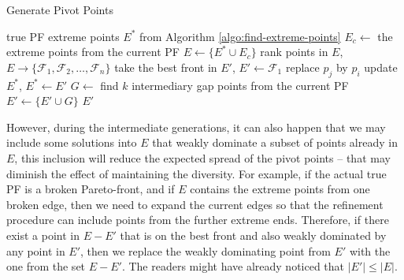 \documentclass[journal]{IEEEtran}
\let\MYoriglatexcaption\caption
\renewcommand{\caption}[2][\relax]{\MYoriglatexcaption[#2]{#2}}
\begin{document}
\begin{algorithm}[tp]
\caption{Generate Pivot Points}
\label{algo:generate-pivot-points}
\begin{algorithmic}[1]
	\REQUIRE true PF extreme points $E^{\ast}$ from Algorithm \ref{algo:find-extreme-points}
	\STATE $E_c \leftarrow$ the extreme points from the current PF
	\STATE $E \leftarrow \{E^\ast \cup E_c\}$
	\STATE rank points in $E$, $E \rightarrow \{\mathcal{F}_1, \mathcal{F}_2, \ldots, \mathcal{F}_n\}$
	\STATE take the best front in $E'$, $E' \leftarrow \mathcal{F}_1$
			\STATE replace $p_j$ by $p_i$
		\ENDIF
	\ENDFOR
	\STATE update $E^\ast$, $E^\ast \leftarrow E'$
	\STATE $G \leftarrow$ find $k$ intermediary gap points from the current PF
	\STATE $E' \leftarrow \{E' \cup G\}$
	\RETURN $E'$
\end{algorithmic}
\end{algorithm}

However, during the intermediate generations, it can also happen that we may include some solutions into \(E\) that weakly dominate a subset of points already in \(E\), this inclusion will reduce the expected spread of the pivot points -- that may diminish the effect of maintaining the diversity. For example, if the actual true PF is a broken Pareto-front, and if \(E\) contains the extreme points from one broken edge, then we need to expand the current edges so that the refinement procedure can include points from the further extreme ends. Therefore, if there exist a point in \(E - E'\) that is on the best front and also weakly dominated by any point in \(E'\), then we replace the weakly dominating point from \(E'\) with the one from the set \(E - E'\). The readers might have already noticed that \(|E'| \le |E|\).
\end{document}
